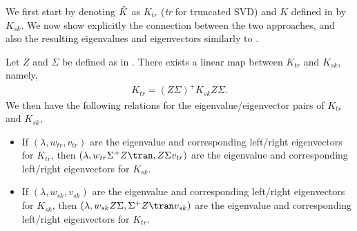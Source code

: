 \documentclass{article}
\begin{document}
We first start by denoting \(\Hat K\) as \(K_{tr}\) (\textit{tr} for truncated SVD) and \(K\) defined in  by \(K_{sk}\). We now show explicitly the connection between the two approaches, and also the resulting eigenvalues and eigenvectors similarly to .
\begin{proposition}\label{prop:simp_kedmd}
    Let \(Z\) and \(\Sigma\) be defined as in . There exists a linear map between \(K_{tr}\) and \(K_{sk}\), namely,
    \begin{align*}
        K_{tr} = (Z \Sigma)^+ K_{sk} Z\Sigma.
    \end{align*}
    We then have the following relations for the eigenvalue/eigenvector pairs of \(K_{tr}\) and \(K_{sk}\),
    \begin{itemize}
        \item If \((\lambda, w_{tr}, v_{tr})\) are the eigenvalue and corresponding left/right eigenvectors for \(K_{tr}\), then \((\lambda, w_{tr} \Sigma^+ Z\tran, Z\Sigma v_{tr})\) are the eigenvalue and corresponding left/right eigenvectors for \(K_{sk}\).
        \item If \((\lambda, w_{sk}, v_{sk})\) are the eigenvalue and corresponding left/right eigenvectors for \(K_{sk}\), then \((\lambda, w_{sk} Z\Sigma, \Sigma^+Z\tran v_{sk})\) are the eigenvalue and corresponding left/right eigenvectors for \(K_{tr}\).
    \end{itemize}
\end{proposition}
\end{document}
